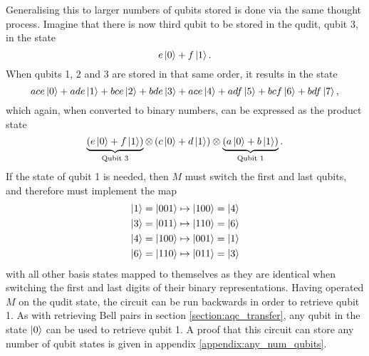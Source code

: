 Generalising this to larger numbers of qubits stored is done via the same thought process.
Imagine that there is now third qubit to be stored in the qudit, qubit 3, in the state
\begin{equation}
    e\ket{0} + f\ket{1}.
\end{equation}
When qubits 1, 2 and 3 are stored in that same order, it results in the state
\begin{equation}
    ace\ket{0} + ade\ket{1} + bce\ket{2} + bde\ket{3} + ace\ket{4} + adf\ket{5} + bcf\ket{6} + bdf\ket{7},
\end{equation}
which again, when converted to binary numbers, can be expressed as the product state
\begin{equation}
    \underbrace{\left(e\ket{0} + f\ket{1}\right)}_{\text{Qubit 3}} \otimes \left(c\ket{0} + d\ket{1}\right) \otimes \underbrace{\left(a\ket{0} + b\ket{1}\right)}_{\text{Qubit 1}}.
\end{equation}
If the state of qubit 1 is needed, then $M$ must switch the first and last qubits, and therefore must implement the map
\begin{align}
    \ket{1} = \ket{001} &\mapsto \ket{100} = \ket{4}\\
    \ket{3} = \ket{011} &\mapsto \ket{110} = \ket{6}\\
    \ket{4} = \ket{100} &\mapsto \ket{001} = \ket{1}\\
    \ket{6} = \ket{110} &\mapsto \ket{011} = \ket{3}
\end{align}
with all other basis states mapped to themselves as they are identical when switching the first and last digits of their binary representations.
Having operated $M$ on the qudit state, the circuit can be run backwards in order to retrieve qubit 1. As with retrieving Bell pairs in section \ref{section:aqc_transfer}, any qubit in the state $\ket{0}$ can be used to retrieve qubit 1. A proof that this circuit can store any number of qubit states is given in appendix \ref{appendix:any_num_qubits}.

